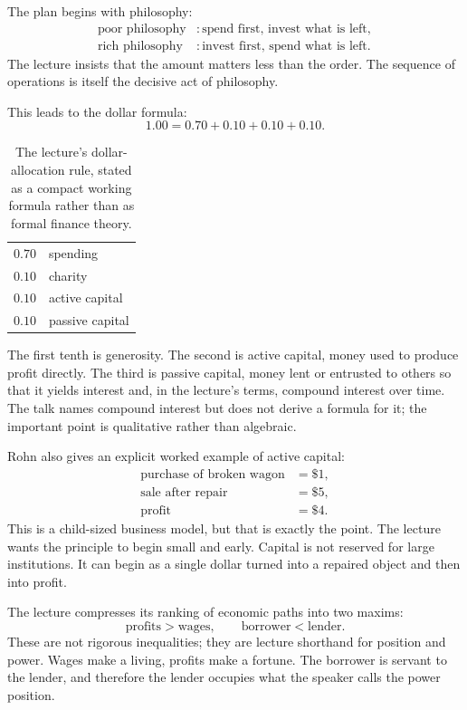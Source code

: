 The plan begins with philosophy:
\begin{align}
\text{poor philosophy} &: \text{spend first, invest what is left},\\
\text{rich philosophy} &: \text{invest first, spend what is left}.
\end{align}
The lecture insists that the amount matters less than the order. The sequence of operations is itself the decisive act of philosophy.

This leads to the dollar formula:
\begin{equation}
1.00 = 0.70 + 0.10 + 0.10 + 0.10.
\end{equation}

\begin{table}[t]
\centering
\begin{tabular}{ll}
$0.70$ & spending \\
$0.10$ & charity \\
$0.10$ & active capital \\
$0.10$ & passive capital
\end{tabular}
\caption{The lecture's dollar-allocation rule, stated as a compact working formula rather than as formal finance theory.}
\end{table}

The first tenth is generosity. The second is active capital, money used to produce profit directly. The third is passive capital, money lent or entrusted to others so that it yields interest and, in the lecture's terms, compound interest over time. The talk names compound interest but does not derive a formula for it; the important point is qualitative rather than algebraic.

Rohn also gives an explicit worked example of active capital:
\begin{align}
\text{purchase of broken wagon} &= \$1,\\
\text{sale after repair} &= \$5,\\
\text{profit} &= \$4.
\end{align}
This is a child-sized business model, but that is exactly the point. The lecture wants the principle to begin small and early. Capital is not reserved for large institutions. It can begin as a single dollar turned into a repaired object and then into profit.

The lecture compresses its ranking of economic paths into two maxims:
\begin{equation}
\text{profits} > \text{wages}, \qquad \text{borrower} < \text{lender}.
\end{equation}
These are not rigorous inequalities; they are lecture shorthand for position and power. Wages make a living, profits make a fortune. The borrower is servant to the lender, and therefore the lender occupies what the speaker calls the power position.

